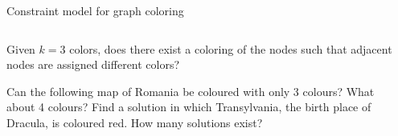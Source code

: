 \begin{frame}{Constraint model for graph coloring}
\begin{columns}
\begin{column}{0.7\textwidth}
Given $k=3$ colors, does there exist a coloring of the nodes such that adjacent nodes are assigned different colors?

\begin{example}
Can the following map of Romania be coloured with only 3 colours? What about 4
colours? Find a solution in which Transylvania, the birth place of Dracula, is coloured
red. How many solutions exist?
\end{example}
\centering
{}  

\end{column}

\begin{column}{0.3\textwidth}
 \\
\end{column}
\end{columns}
 
\end{frame}


